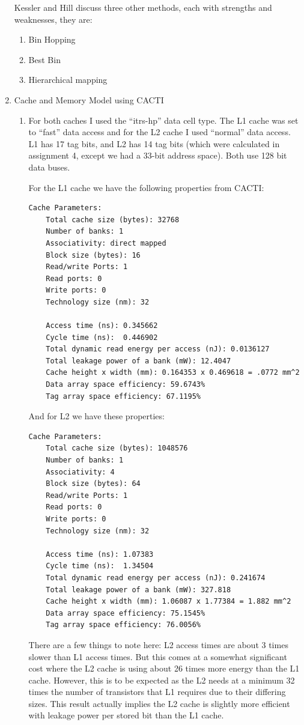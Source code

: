 \documentclass[a4paper, 11pt]{exam}
\begin{document}
\begin{enumerate}
Kessler and Hill discuss three other methods, each with strengths and 
weaknesses, they are:
\begin{enumerate}
\item Bin Hopping
\item Best Bin
\item Hierarchical mapping
\end{enumerate}

\item Cache and Memory Model using CACTI

\begin{enumerate}
\item For both caches I used the ``itrs-hp'' data cell type. The L1 cache
was set to ``fast'' data access and for the L2 cache I used ``normal'' data
access. L1 has 17 tag bits, and L2 has 14 tag bits (which were calculated
in assignment 4, except we had a 33-bit address space). Both use 128 bit data
buses.

For the L1 cache we have the following properties from CACTI:
\begin{verbatim}
Cache Parameters:
    Total cache size (bytes): 32768
    Number of banks: 1
    Associativity: direct mapped
    Block size (bytes): 16
    Read/write Ports: 1
    Read ports: 0
    Write ports: 0
    Technology size (nm): 32

    Access time (ns): 0.345662
    Cycle time (ns):  0.446902
    Total dynamic read energy per access (nJ): 0.0136127
    Total leakage power of a bank (mW): 12.4047
    Cache height x width (mm): 0.164353 x 0.469618 = .0772 mm^2
    Data array space efficiency: 59.6743%
    Tag array space efficiency: 67.1195%
\end{verbatim}
And for L2 we have these properties:
\begin{verbatim}
Cache Parameters:
    Total cache size (bytes): 1048576
    Number of banks: 1
    Associativity: 4
    Block size (bytes): 64
    Read/write Ports: 1
    Read ports: 0
    Write ports: 0
    Technology size (nm): 32

    Access time (ns): 1.07383
    Cycle time (ns):  1.34504
    Total dynamic read energy per access (nJ): 0.241674
    Total leakage power of a bank (mW): 327.818
    Cache height x width (mm): 1.06087 x 1.77384 = 1.882 mm^2
    Data array space efficiency: 75.1545%
    Tag array space efficiency: 76.0056%
\end{verbatim}
There are a few things to note here: L2 access times are about 3 times slower
than L1 access times. But this comes at a somewhat significant cost where the
L2 cache is using about 26 times more energy than the L1 cache. However, this is
to be expected as the L2 needs at a minimum 32 times the number of
transistors that L1 requires due to their differing sizes. This result actually
implies the L2 cache is slightly more efficient with leakage power per stored
bit than the L1 cache.


\end{enumerate}
\end{enumerate}
\end{document}
